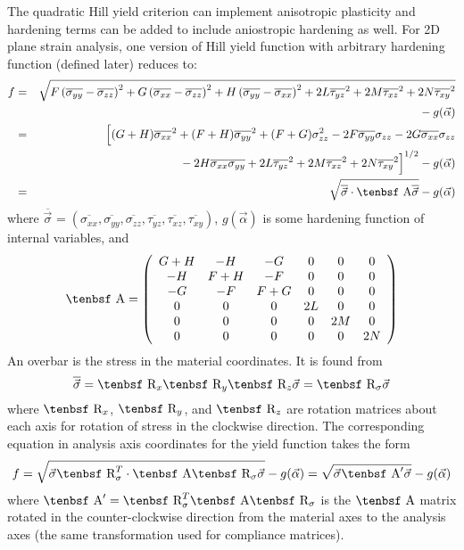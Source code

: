 \documentclass[11pt]{article}
\def\A{\hbox{\tenbsf A}}
\def\R{\hbox{\tenbsf R}}
\def\s#1{\sigma_{#1}}
\def\t#1{\tau_{#1}}
\begin{document}
The quadratic Hill yield criterion can implement anisotropic plasticity and hardening terms can be added to include aniostropic hardening as well. For 2D plane strain analysis, one version of Hill yield function with arbitrary hardening function (defined later) reduces to:
\begin{eqnarray}
          f & = & \sqrt{F\left(\overline{\s{yy}}- \overline{\s{zz}}\right)^2 + G\left(\overline{\s{xx}}- \overline{\s{zz}}\right)^2
               + H\left(\overline{\s{yy}}- \overline{\s{xx}}\right)^2 +2L\overline{\t{yz}}^2 +2M\overline{\t{xz}}^2
                 +2N\overline{\t{xy}}^2}
  \nonumber\\
 &&\qquad\mbox{}
                 - g(\vec\alpha) \\
             & = & \Bigl[(G+H)\overline{\s{xx}}^2  + (F+H)\overline{\s{yy}}^2 + (F+G)\s{zz}^2
                   -2F \overline{\s{yy}}\s{zz} - 2G \overline{\s{xx}}\s{zz}
 \nonumber\\
 &&\qquad\mbox{}
                    - 2H \overline{\s{xx}}\overline{\s{yy}}
                   +2L\overline{\t{yz}}^2 +2M\overline{\t{xz}}^2+2N\overline{\t{xy}}^2\Bigr]^{1/2}  - g(\vec\alpha) \\
             & = & \sqrt{\overline{\vec\s{}} \cdot \A \overline{\vec\s{}}} - g(\vec\alpha)       \label{froteq}
\end{eqnarray}
where $\overline{\vec\s{}} = (\overline{\s{xx}}, \overline{\s{yy}}, \overline{\s{zz}}, \overline{\t{yz}}, \overline{\t{xz}}, \overline{\t{xy}})$, $g(\vec\alpha)$ is some hardening function of internal variables, and
\begin{equation}
      \A = \left( \begin{array}{cccccc}
                       G+H & -H & -G & 0 & 0 & 0 \\
                       -H & F+H & -F & 0 & 0 & 0\\
                       -G & -F & F+G & 0 & 0 & 0\\
                        0 & 0 & 0 & 2L & 0 & 0 \\
                       0 & 0 & 0 & 0 & 2M & 0 \\
                      0 & 0 & 0 & 0 & 0 & 2N
                       \end{array} \right)
\end{equation}
An overbar is the stress in the material coordinates. It is found from
\begin{equation}
     \overline{\vec\s{}} = \R_x\R_y\R_z\vec\s{} = \R_\sigma\vec\s{}
\end{equation}
where $\R_x$, $\R_y$, and $\R_z$ are rotation matrices about each axis for rotation of stress in the clockwise direction.
The corresponding equation in analysis axis coordinates for the yield function takes the form
\begin{equation}
     f = \sqrt{\vec\s{} \R_\sigma^T\cdot \A \R_\sigma\vec\s{}} - g(\vec\alpha) = \sqrt{\vec\s{} \A' \vec\s{}} - g(\vec\alpha)     \label{fanaleq}
\end{equation}
where $\A' = \R_\sigma^T\A\R_\sigma$ is the $\A$ matrix rotated in the counter-clockwise direction from the material axes to the analysis axes (the same transformation used for compliance matrices).
\end{document}
